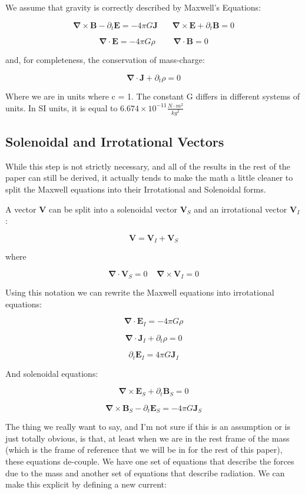 \documentclass {article}
\renewcommand\vec{\mathbf}
\let\OldS\nabla
\renewcommand{\nabla}{\boldsymbol{\OldS}}
\begin{document}
We assume that gravity is correctly described by Maxwell's Equations:

$$\nabla \times \vec B  - \partial_t \vec E  = -4 \pi G \vec J ~~~~~~~~ \nabla \times \vec E + \partial_t \vec B = 0    $$

$$\nabla \cdot \vec E = -4 \pi G \rho ~~~~~~~~~~ \nabla \cdot \vec B = 0   $$

and, for completeness, the conservation of mass-charge:

$$\nabla \cdot \vec J + \partial_t \rho = 0 $$

Where we are in units where c = 1. The constant G differs in different systems of units. In SI units, it is equal to $6.674 \times 10^{-11} \frac {N \cdot m^2}{kg^2}$ 

\newpage 
\subsection{Solenoidal and Irrotational Vectors}
While this step is not strictly necessary, and all of the results in the rest of the paper can still be derived, it actually tends to make the math a little cleaner to split the Maxwell equations into their Irrotational and Solenoidal forms.

A vector $\vec V$ can be split into a solenoidal vector $\vec V_S$ and an irrotational vector $\vec V_I$:

$$\vec V = \vec V_I + \vec V_S $$

where

$$\nabla \cdot \vec V_S = 0 ~~~~~ \nabla \times \vec V_I = 0 $$

Using this notation we can rewrite the Maxwell equations into irrotational equations:

$$\nabla \cdot \vec E_I = -4 \pi G  \rho$$

$$\nabla \cdot \vec J_I + \partial_t \rho = 0 $$

$$ \partial_t \vec E_I = 4 \pi G \vec J_I $$

And solenoidal equations:

$$\nabla \times \vec E_S + \partial_t \vec B_S = 0 $$

$$\nabla \times \vec B_S - \partial_t \vec E_S =  - 4 \pi G \vec J_S$$

The thing we really want to say, and I'm not sure if this is an assumption or is just totally obvious, is that, at least when we are in the rest frame of the mass (which is the frame of reference that we will be in for the rest of this paper), these equations de-couple. We have one set of equations that describe the forces due to the mass and another set of equations that describe radiation. We can make this explicit by defining a new current:
\end{document}
